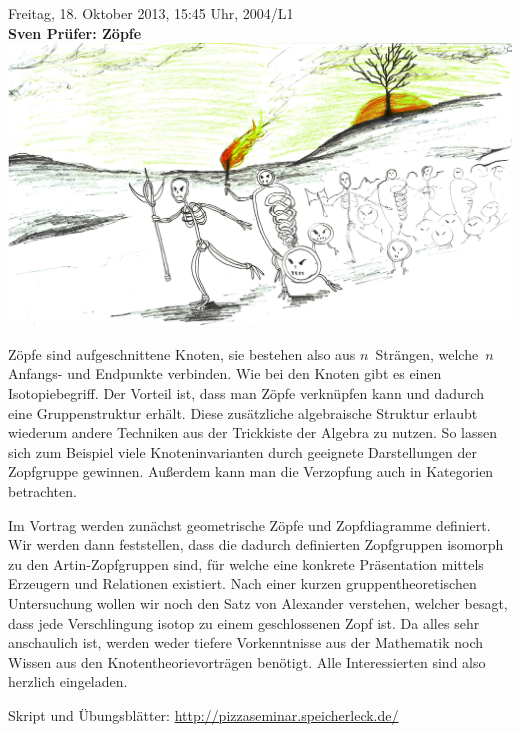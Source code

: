 \documentclass[a4paper,ngerman,landscape]{scrartcl}
\begin{document}
\newpage

\begin{center}
  \huge
  Freitag, 18. Oktober 2013, 15:45 Uhr, 2004/L1 \\
  \textbf{Sven Prüfer: Zöpfe}
  \vfill
  \includegraphics[scale=0.55]{knotenarmee-duester-farbkorrigiert}
  \vfill

  \large
  \begin{minipage}{0.8\textwidth}
    \setlength\parskip{\medskipamount}
    Zöpfe sind aufgeschnittene Knoten, sie bestehen also aus $n$~Strängen,
    welche~$n$ Anfangs- und Endpunkte verbinden. Wie bei den Knoten gibt es
    einen Isotopiebegriff. Der Vorteil ist, dass man Zöpfe
    verknüpfen kann und dadurch eine Gruppenstruktur erhält. Diese
    zusätzliche algebraische Struktur erlaubt wiederum andere Techniken aus
    der Trickkiste der Algebra zu nutzen. So lassen sich zum Beispiel viele
    Kno\-ten\-in\-va\-ri\-an\-ten durch geeignete Darstellungen der Zopfgruppe gewinnen.
    Außerdem kann man die Verzopfung auch in Kategorien betrachten.

    Im Vortrag werden zunächst geometrische Zöpfe und Zopfdiagramme
    definiert. Wir werden dann feststellen, dass die dadurch definierten
    Zopfgruppen isomorph zu den Artin-Zopfgruppen sind, für welche eine
    konkrete Präsentation mittels Erzeugern und Relationen existiert. Nach
    einer kurzen gruppentheoretischen Untersuchung wollen wir noch den Satz
    von Alexander verstehen, welcher besagt, dass jede Verschlingung isotop
    zu einem geschlossenen Zopf ist. Da alles sehr anschaulich ist, werden
    weder tiefere Vorkenntnisse aus der Mathematik noch Wissen aus den
    Knotentheorievorträgen benötigt. Alle Interessierten sind also herzlich
    eingeladen.
  \end{minipage}
\end{center}

\hfill\small Skript und Übungsblätter: \url{http://pizzaseminar.speicherleck.de/}
\end{document}
